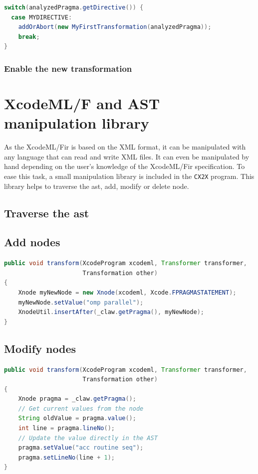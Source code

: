 \documentclass[a4paper, 11pt]{report}
\def\xcodeml{XcodeML/F\xspace}
\def\cx2x{\lstinline!CX2X!\xspace}
\begin{document}
\begin{lstlisting}[label=lst:categorization, caption=ClawXcodeMlTranslator.java, language=java]
switch(analyzedPragma.getDirective()) {
  case MYDIRECTIVE:
    addOrAbort(new MyFirstTransformation(analyzedPragma));
    break;
}
\end{lstlisting}


\subsection{Enable the new transformation}



\chapter{\xcodeml and AST manipulation library}
\label{chapter:astmanip}
As the \xcodeml \gls{ir} is based on the XML format, it can be manipulated with
any language that can read and write XML files. It can even be manipulated by 
hand depending on the user's knowledge of the \xcodeml \gls{ir} specification. 
To ease this task, a small manipulation library is included in the \cx2x 
program. This library helps to traverse the \gls{ast}, add, modify or delete 
node.

\section{Traverse the \gls{ast}}

\section{Add nodes}

\begin{lstlisting}[label=lst:add_node, language=Java, caption=XcodeML/F add node example]
public void transform(XcodeProgram xcodeml, Transformer transformer,
                      Transformation other)
{                      
    Xnode myNewNode = new Xnode(xcodeml, Xcode.FPRAGMASTATEMENT);
    myNewNode.setValue("omp parallel");
    XnodeUtil.insertAfter(_claw.getPragma(), myNewNode);
}
\end{lstlisting}

\section{Modify nodes}

\begin{lstlisting}[label=lst:update_node, language=Java, caption=XcodeML/F update node example]
public void transform(XcodeProgram xcodeml, Transformer transformer,
                      Transformation other)
{                      
    Xnode pragma = _claw.getPragma();
    // Get current values from the node
    String oldValue = pragma.value();
    int line = pragma.lineNo();
    // Update the value directly in the AST
    pragma.setValue("acc routine seq");
    pragma.setLineNo(line + 1);
}
\end{lstlisting}
\end{document}
